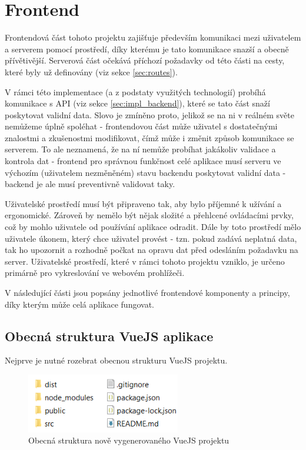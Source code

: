 \section{Frontend}\label{sec:impl_frontend}
Frontendová část tohoto projektu zajišťuje především komunikaci mezi uživatelem a serverem pomocí prostředí, díky kterému je tato komunikace snazší a obecně přívětivější. Serverová část očekává příchozí požadavky od této části na cesty, které byly už definovány (viz sekce \ref{sec:routes}).

V rámci této implementace (a z podstaty využitých technologií) probíhá komunikace s API (viz sekce \ref{sec:impl_backend}), které se tato část snaží poskytovat validní data. Slovo  je zmíněno proto, jelikož se na ni v reálném světe nemůžeme úplně spoléhat - frontendovou část může uživatel s dostatečnými znalostmi a zkušenostmi modifikovat, čímž může i změnit způsob komunikace se serverem. To ale neznamená, že na ní nemůže probíhat jakákoliv validace a kontrola dat - frontend pro správnou funkčnost celé aplikace musí serveru ve výchozím (uživatelem nezměněném) stavu backendu poskytovat validní data - backend je ale musí preventivně validovat taky.

Uživatelské prostředí musí být připraveno tak, aby bylo příjemné k užívání a ergonomické. Zároveň by nemělo být nějak složité a přehlcené ovládacími prvky, což by mohlo uživatele od používání aplikace odradit. Dále by toto prostředí mělo uživatele  úkonem, který chce uživatel provést - tzn. pokud zadává neplatná data, tak ho upozornit a rozhodně počkat na opravu dat před odesláním požadavku na server. Uživatelské prostředí, které v rámci tohoto projektu vzniklo, je určeno primárně pro vykreslování ve webovém prohlížeči.

V následující části jsou popsány jednotlivé frontendové komponenty a principy, díky kterým může celá aplikace fungovat.
	
	\subsection{Obecná struktura VueJS aplikace}\label{sec:obecna_str_vuejs}
	Nejprve je nutné rozebrat obecnou strukturu VueJS projektu.
	
	\begin{figure}[H]
		\centering
		\includegraphics[width=0.6\textwidth]{img/vuejs_struktura.png} 
		\caption{Obecná struktura nově vygenerovaného VueJS projektu}
		\label{fig:vuejs_str}
	\end{figure}

